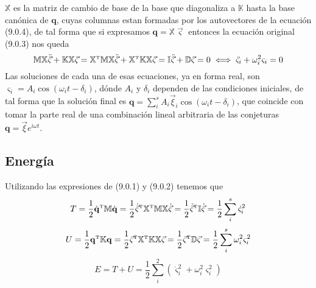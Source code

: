$\mathbb{X}$ es la matriz de cambio de base de la base que diagonaliza a $\mathbb{K}$ hasta la base canónica de $\mathbf{q}$, cuyas columnas estan formadas por los autovectores de la ecuación (9.0.4), de tal forma que si expresamos $\mathbf{\mathbf{q}} = \mathbb{X} \vec{\varsigma}$ entonces la ecuación original (9.0.3) nos queda 
\begin{equation} \label{6.1.1}
    \mathbb{M}\mathbb{X} \ddot{\vec{\varsigma}} + \mathbb{K} \mathbb{X} \vec{\varsigma} = \mathbb{X}^{\mbox{\tiny T}}\mathbb{M}\mathbb{X} \ddot{\vec{\varsigma}} + \mathbb{X}^{\mbox{\tiny T}}\mathbb{K} \mathbb{X} \vec{\varsigma} = \mathbb{I}\ddot{\vec{\varsigma}} + \mathbb{D}\vec{\varsigma} = 0 \iff \ddot{\varsigma_i} + \omega_i^2 \varsigma_i = 0
\end{equation}
Las soluciones de cada una de esas ecuaciones, ya en forma real, son $\varsigma_i = A_i \cos{(\omega_i t -\delta_i)}$, dónde $A_i$ y $\delta_i$ dependen de las condiciones iniciales, de tal forma que la solución final es $\mathbf{q} = \sum_i^s A_i \vec{\xi}_i \cos{(\omega_i t -\delta_i)}$, que coincide con tomar la parte real de una combinación lineal arbitraria de las conjeturas $\mathbf{q} = \vec{\xi} e^{i\omega t}$.


\vspace{-15pt}
\subsection{Energía}
Utilizando las expresiones de (9.0.1) y (9.0.2) tenemos que 
\begin{equation} \label{6.1.1}
    T = \frac{1}{2} \dot{\mathbf{q}}^{\mbox{\tiny T}}\mathbb{M} \dot{\mathbf{q}} = \frac{1}{2} \dot{\vec{\varsigma}}^{\mbox{\tiny T}} \mathbb{X}^{\mbox{\tiny T}} \mathbb{M} \mathbb{X}\dot{\vec{\varsigma}} =\frac{1}{2} \dot{\vec{\varsigma}}^{\mbox{\tiny T}} \mathbb{I}\dot{\vec{\varsigma}} = \frac{1}{2} \sum_i^s \dot{\varsigma}_i^2
\end{equation}
\begin{equation} \label{6.1.1}
    U = \frac{1}{2} \mathbf{q}^{\mbox{\tiny T}}\mathbb{K} \mathbf{q} = \frac{1}{2} \vec{\varsigma}^{\mbox{\tiny T}} \mathbb{X}^{\mbox{\tiny T}} \mathbb{K} \mathbb{X}\vec{\varsigma} = \frac{1}{2} \vec{\varsigma}^{\mbox{\tiny T}} \mathbb{D}\vec{\varsigma} =\frac{1}{2} \sum_i^s \omega_i^2\varsigma_i^2
\end{equation}
\begin{equation} \label{6.1.1}
    E = T+U = \frac{1}{2}\sum_i^2 \left(\dot{\varsigma}_i^2 + \omega_i^2\varsigma_i^2\right)
\end{equation}

